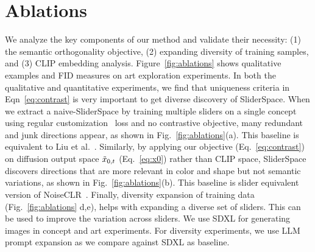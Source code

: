 \section{Ablations}
\label{sec:ablations}
We analyze the key components of our method and validate their necessity: (1) the semantic orthogonality objective, (2) expanding diversity of training samples, and (3) CLIP embedding analysis. Figure~\ref{fig:ablations} shows qualitative examples and FID measures on art exploration experiments. In both the qualitative and quantitative experiments, we find that uniqueness criteria in Eqn~\ref{eq:contrast} is very important to get diverse discovery of SliderSpace. When we extract a naive-SliderSpace by training multiple sliders on a single concept using regular customization~\cite{kumari2022customdiffusion,ruiz2022dreambooth} loss and no contrastive objective, many redundant and junk directions appear, as shown in Fig.~\ref{fig:ablations}(a). This baseline is equivalent to Liu et al.~\cite{liu2023unsupervised}. Similarly, by applying our objective (Eq.~\ref{eq:contrast}) on diffusion output space $\Tilde{x}_{0,t}$ (Eq.~\ref{eq:x0}) rather than CLIP space, SliderSpace discovers directions that are more relevant in color and shape but not semantic variations, as shown in Fig.~\ref{fig:ablations}(b). This baseline is slider equivalent version of NoiseCLR~\cite{dalva2024noiseclr}. Finally, diversity expansion of training data (Fig.~\ref{fig:ablations} d,e), helps with expanding a diverse set of sliders. This can be used to improve the variation across sliders. We use SDXL for generating images in concept and art experiments. For diversity experiments, we use LLM prompt expansion as we compare against SDXL as baseline.
